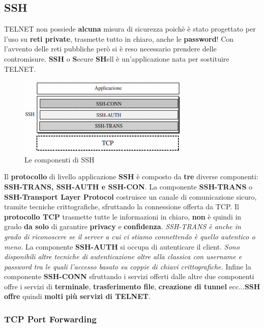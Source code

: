 \documentclass[11pt,a4paper,oneside]{book}
\theoremstyle{definition}
\begin{document}
\subsection{SSH}
TELNET non possiede \textbf{alcuna} misura di sicurezza poichè è stato progettato per l'uso su \textbf{reti private}, trasmette tutto in chiaro, anche le \textbf{password}! Con l'avvento delle reti pubbliche però si è reso necessario prendere delle contromisure. \newline
\textbf{SSH} o \textbf{S}ecure \textbf{SH}ell è un'applicazione nata per sostituire TELNET.
\begin{figure}[!h]
	\includegraphics[scale=0.7]{Immagini/SSH.png}
	\centering
	\caption{Le componenti di SSH}
\end{figure}\newline
Il \textbf{protocollo} di livello applicazione \textbf{SSH} è composto da \textbf{tre} diverse componenti: \textbf{SSH-TRANS, SSH-AUTH e SSH-CON}. La componente \textbf{SSH-TRANS} o \textbf{SSH-Transport Layer Protocol} costruisce un canale di comunicazione sicuro, tramite tecniche crittografiche, sfruttando la connessione offerta da TCP. Il \textbf{protocollo TCP} trasmette tutte le informazioni in chiaro, \textbf{non} è quindi in grado \textbf{da solo} di garantire \textbf{privacy} e \textbf{confidenza}. \textit{SSH-TRANS è anche in grado di riconoscere se il server a cui ci stiamo connettendo è quello autentico o meno.} La componente \textbf{SSH-AUTH} si occupa di autenticare il client. \textit{Sono disponibili altre tecniche di autenticazione oltre alla classica con username e password tra le quali l'accesso basato su coppie di chiavi crittografiche.} Infine la componente \textbf{SSH-CONN} sfruttando i servizi offerti dalle altre due componenti offre i servizi di \textbf{terminale}, \textbf{trasferimento file}, \textbf{creazione di tunnel} ecc...\newline \textbf{SSH offre} quindi \textbf{molti più servizi di TELNET}.
\subsubsection{TCP Port Forwarding}
\end{document}
